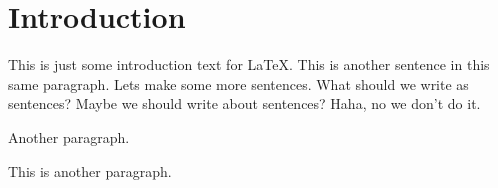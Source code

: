 \section{Introduction}

This is just some introduction text for \LaTeX.
This is another sentence in this same paragraph.
Lets make some more sentences.
What should we write as sentences?
Maybe we should write about sentences?
Haha, no we don't do it.

Another paragraph.

This is another paragraph.



